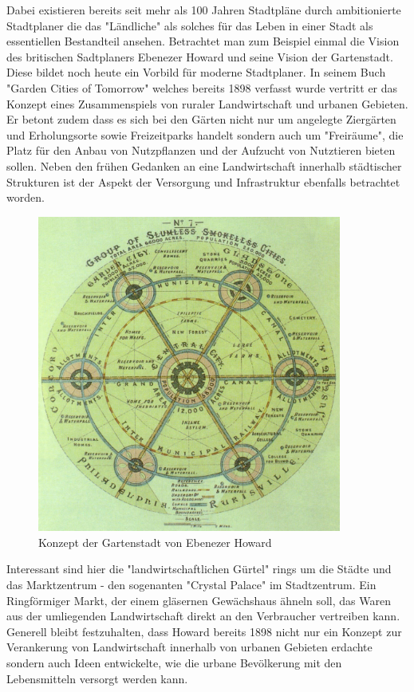 \documentclass{article}
\begin{document}
Dabei existieren bereits seit mehr als 100 Jahren Stadtpläne durch ambitionierte Stadtplaner die das "Ländliche" als solches für das Leben in einer
Stadt als essentiellen Bestandteil ansehen. Betrachtet man zum Beispiel einmal die Vision des britischen Sadtplaners Ebenezer Howard und seine Vision der Gartenstadt. Diese bildet noch heute ein Vorbild für moderne Stadtplaner. In seinem Buch "Garden Cities of Tomorrow" welches bereits 1898 verfasst wurde vertritt er das Konzept eines Zusammenspiels von ruraler Landwirtschaft und urbanen Gebieten. Er betont zudem dass es sich bei den
Gärten nicht nur um angelegte Ziergärten und Erholungsorte sowie Freizeitparks handelt sondern auch um "Freiräume", die Platz für den Anbau von
Nutzpflanzen und der Aufzucht von Nutztieren bieten sollen. Neben den frühen Gedanken an eine Landwirtschaft innerhalb städtischer Strukturen ist der Aspekt der Versorgung und Infrastruktur ebenfalls betrachtet worden.

\begin{figure}[htp]
\centering
\includegraphics[width=10cm]{image_folder/GardenCityConcept_EbenezerHoward.jpg}
\caption{Konzept der Gartenstadt von Ebenezer Howard}
\label{fig:GardenCityConcept_EbenezerHoward}
\end{figure}

Interessant sind hier die "landwirtschaftlichen Gürtel" rings um die Städte und das Marktzentrum - den sogenanten "Crystal Palace" im Stadtzentrum.
Ein Ringförmiger Markt, der einem gläsernen Gewächshaus ähneln soll, das Waren aus der umliegenden Landwirtschaft direkt an den Verbraucher vertreiben kann. Generell bleibt festzuhalten, dass Howard bereits 1898 nicht nur ein Konzept zur Verankerung von Landwirtschaft innerhalb von urbanen Gebieten erdachte sondern auch Ideen entwickelte, wie die urbane Bevölkerung mit den Lebensmitteln versorgt werden kann.
\end{document}
